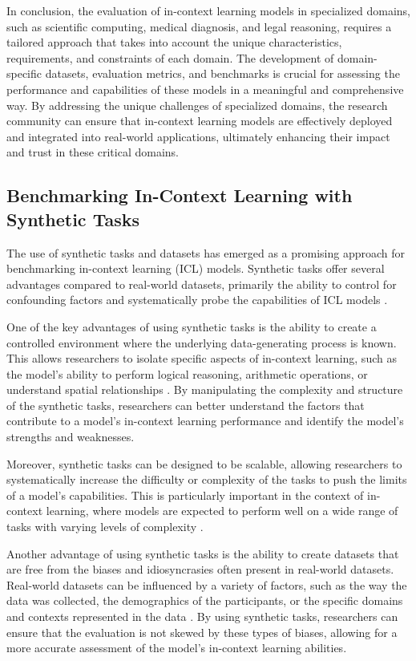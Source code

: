 \documentclass[11pt]{article}
\begin{document}
In conclusion, the evaluation of in-context learning models in specialized domains, such as scientific computing, medical diagnosis, and legal reasoning, requires a tailored approach that takes into account the unique characteristics, requirements, and constraints of each domain. The development of domain-specific datasets, evaluation metrics, and benchmarks is crucial for assessing the performance and capabilities of these models in a meaningful and comprehensive way. By addressing the unique challenges of specialized domains, the research community can ensure that in-context learning models are effectively deployed and integrated into real-world applications, ultimately enhancing their impact and trust in these critical domains.

\subsection{Benchmarking In-Context Learning with Synthetic Tasks}

The use of synthetic tasks and datasets has emerged as a promising approach for benchmarking in-context learning (ICL) models. Synthetic tasks offer several advantages compared to real-world datasets, primarily the ability to control for confounding factors and systematically probe the capabilities of ICL models \cite{ref305}.

One of the key advantages of using synthetic tasks is the ability to create a controlled environment where the underlying data-generating process is known. This allows researchers to isolate specific aspects of in-context learning, such as the model's ability to perform logical reasoning, arithmetic operations, or understand spatial relationships \cite{ref305}. By manipulating the complexity and structure of the synthetic tasks, researchers can better understand the factors that contribute to a model's in-context learning performance and identify the model's strengths and weaknesses.

Moreover, synthetic tasks can be designed to be scalable, allowing researchers to systematically increase the difficulty or complexity of the tasks to push the limits of a model's capabilities. This is particularly important in the context of in-context learning, where models are expected to perform well on a wide range of tasks with varying levels of complexity \cite{ref216}.

Another advantage of using synthetic tasks is the ability to create datasets that are free from the biases and idiosyncrasies often present in real-world datasets. Real-world datasets can be influenced by a variety of factors, such as the way the data was collected, the demographics of the participants, or the specific domains and contexts represented in the data \cite{ref189}. By using synthetic tasks, researchers can ensure that the evaluation is not skewed by these types of biases, allowing for a more accurate assessment of the model's in-context learning abilities.
\end{document}

